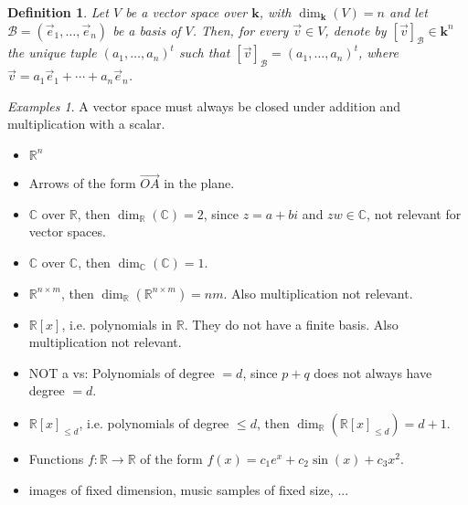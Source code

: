\documentclass{article}
\newtheorem{definition}[theorem]{Definition}
\theoremstyle{remark}
\newtheorem{examples}[theorem]{Examples}
\begin{document}
    \begin{definition} Let $V$ be a vector space over $\mathbf{k}$, with $\dim_{\mathbf{k}}(V)=n$ and let $\mathcal{B}=(\vec{e}_1,\ldots,\vec{e}_n)$ be a basis of $V$. Then, for every $\vec{v}\in V$, denote by $[\vec{v}]_{\mathcal{B}}\in\mathbf{k}^n$ the unique tuple $(a_1,\ldots,a_n)^t$ such that $[\vec{v}]_{\mathcal{B}}=(a_1,\ldots,a_n)^t$, where $\vec{v}=a_1\vec{e}_1+\cdots+a_n\vec{e}_n$.
    \end{definition}
    \begin{examples} A vector space must always be closed under addition and multiplication with a scalar.
        \begin{itemize}
            \item $\mathbb{R}^n$
            \item Arrows of the form $\overrightarrow{OA}$ in the plane.
            \item $\mathbb{C}$ over $\mathbb{R}$, then $\dim_{\mathbb{R}}(\mathbb{C})=2$, since $z=a+bi$ and $zw\in\mathbb{C}$, not relevant for vector spaces.
            \item $\mathbb{C}$ over $\mathbb{C}$, then $\dim_{\mathbb{C}}(\mathbb{C})=1$.
            \item $\mathbb{R}^{n\times m}$, then $\dim_{\mathbb{R}}(\mathbb{R}^{n\times m})=nm$. Also multiplication not relevant.
            \item $\mathbb{R}[x]$, i.e. polynomials in $\mathbb{R}$. They do not have a finite basis. Also multiplication not relevant.
            \item NOT a vs: Polynomials of degree $=d$, since $p+q$ does not always have degree $=d$.
            \item $\mathbb{R}[x]_{\leq d}$, i.e. polynomials of degree $\leq d$, then $\dim_{\mathbb{R}}(\mathbb{R}[x]_{\leq d})=d+1$.
            \item Functions $f:\mathbb{R}\to\mathbb{R}$ of the form $f(x)=c_1e^x+c_2\sin(x)+c_3x^2$.
            \item images of fixed dimension, music samples of fixed size, ...
        \end{itemize}
    \end{examples}
\end{document}
